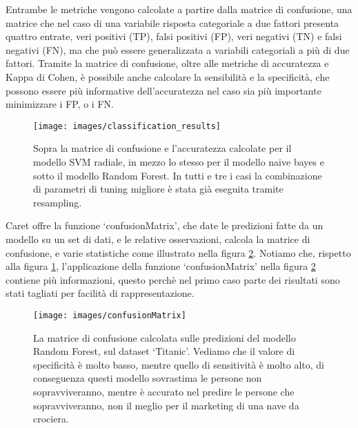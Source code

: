 \documentclass[12pt]{article}
\begin{document}
Entrambe le metriche vengono calcolate a partire dalla matrice di confusione, una matrice che nel caso di una variabile risposta categoriale a due fattori presenta quattro entrate, veri positivi (TP), falsi positivi (FP), 
veri negativi (TN) e falsi negativi (FN), ma che può essere generalizzata a variabili categoriali a più di due fattori.
Tramite la matrice di confusione, oltre alle metriche di accuratezza e Kappa di Cohen, è possibile anche calcolare la sensibilità e la specificità, che possono essere più informative dell'accuratezza nel caso sia più importante minimizzare i FP, o i FN.

\begin{figure}[H]
    \centering
    \texttt{[image: images/classification\_results]}
    \caption{Sopra la matrice di confusione e l'accuratezza calcolate per il modello SVM radiale, in mezzo lo stesso per il modello naive bayes e sotto il modello Random Forest. In tutti e tre i casi la combinazione di parametri di tuning migliore è stata già eseguita tramite resampling.}
    \label{img:classification_results}
\end{figure}

Caret offre la funzione ‘confusionMatrix’, che date le predizioni fatte da un modello su un set di dati, e le relative osservazioni, calcola la matrice di confusione, e varie statistiche come illustrato nella figura \ref{img:confusionMatrix}. 
Notiamo che, rispetto alla figura \ref{img:classification_results}, l'applicazione della funzione ‘confusionMatrix’ nella figura \ref{img:confusionMatrix} contiene più informazioni, questo perchè nel primo caso parte dei risultati sono stati tagliati per facilità di rappresentazione.

\begin{figure}[H]
    \centering
    \texttt{[image: images/confusionMatrix]}
    \caption{La matrice di confusione calcolata sulle predizioni del modello Random Forest, sul dataset ‘Titanic’. Vediamo che il valore di specificità è molto basso, mentre quello di sensitività è molto alto, 
    di conseguenza questi modello sovrastima le persone non sopravviveranno, mentre è accurato nel predire le persone che sopravviveranno, non il meglio per il marketing di una nave da crociera. }%
    \label{img:confusionMatrix}
\end{figure}
\end{document}
